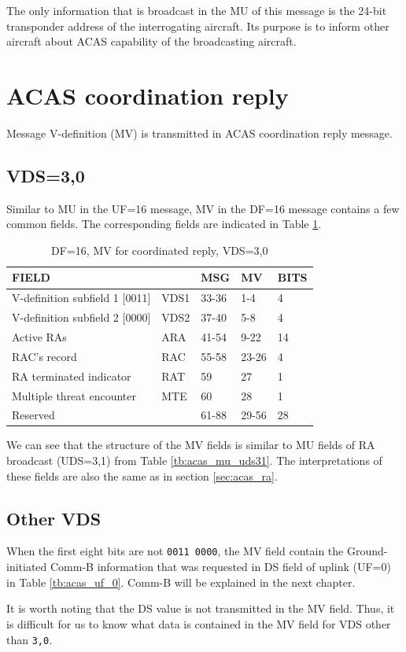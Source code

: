 The only information that is broadcast in the MU of this message is the 24-bit transponder address of the interrogating aircraft. Its purpose is to inform other aircraft about ACAS capability of the broadcasting aircraft.


\section{ACAS coordination reply}

Message V-definition (MV) is transmitted in ACAS coordination reply message. 

\subsection{VDS=3,0}
Similar to MU in the UF=16 message, MV in the DF=16 message contains a few common fields. The corresponding fields are indicated in Table \ref{tb:acas_mv_vds30}.

\begin{table}[ht]
\caption{DF=16, MV for coordinated reply, VDS=3,0}
\label{tb:acas_mv_vds30}
\begin{tabular}{|l|l|l|l|l|}
\hline
\textbf{FIELD} & \textbf{} & \textbf{MSG} & \textbf{MV} & \textbf{BITS} \\ \hline
V-definition subfield 1 [0011] & VDS1 & 33-36 & 1-4 & 4 \\ \hline
V-definition subfield 2 [0000] & VDS2 & 37-40 & 5-8 & 4 \\ \hline
Active RAs & ARA & 41-54 & 9-22 & 14 \\ \hline
RAC's record & RAC & 55-58 & 23-26 & 4 \\ \hline
RA terminated indicator & RAT & 59 & 27 & 1 \\ \hline
Multiple threat encounter & MTE & 60 & 28 & 1 \\ \hline
Reserved &  & 61-88 & 29-56 & 28 \\ \hline
\end{tabular}
\end{table}

We can see that the structure of the MV fields is similar to MU fields of RA broadcast (UDS=3,1) from Table \ref{tb:acas_mu_uds31}. The interpretations of these fields are also the same as in section \ref{sec:acas_ra}.

\subsection{Other VDS}
When the first eight bits are not \texttt{0011 0000}, the MV field contain the Ground-initiated Comm-B information that was requested in DS field of uplink (UF=0) in Table \ref{tb:acas_uf_0}. Comm-B will be explained in the next chapter.

It is worth noting that the DS value is not transmitted in the MV field. Thus, it is difficult for us to know what data is contained in the MV field for VDS other than \texttt{3,0}.
